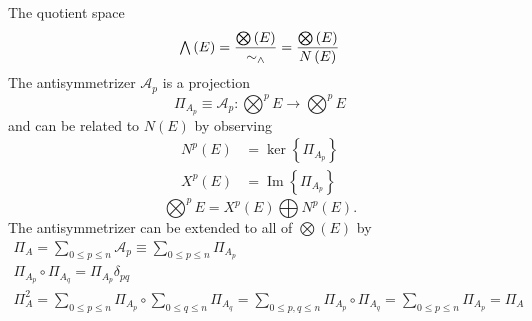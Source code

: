 \documentclass[aps,preprint]{revtex4}%
\begin{document}
The quotient space
\begin{equation}%
{\textstyle\bigwedge}
\left(  E\right)  =\frac{%
{\textstyle\bigotimes}
\left(  E\right)  }{\sim_{\wedge}}=\frac{%
{\textstyle\bigotimes}
\left(  E\right)  }{N\left(  E\right)  }%
\end{equation}
The antisymmetrizer $\mathcal{A}_{p}$ is a projection
\begin{equation}
\Pi_{A_{p}}\equiv\mathcal{A}_{p}:%
{\textstyle\bigotimes\nolimits^{p}}
E\rightarrow%
{\textstyle\bigotimes\nolimits^{p}}
E
\end{equation}
and can be related to $N\left(  E\right)  $ by observing
\begin{align}
N^{p}\left(  E\right)   &  =\ker\left\{  \Pi_{A_{p}}\right\}  \\
X^{p}\left(  E\right)   &  =\operatorname{Im}\left\{  \Pi_{A_{p}}\right\}
\end{align}%
\begin{equation}%
{\textstyle\bigotimes\nolimits^{p}}
E=X^{p}\left(  E\right)
{\textstyle\bigoplus}
N^{p}\left(  E\right)  .
\end{equation}
The antisymmetrizer can be extended to all of $%
{\textstyle\bigotimes}
\left(  E\right)  $ by
\begin{gather}
\Pi_{A}=%
{\textstyle\sum\limits_{0\leq p\leq n}}
\mathcal{A}_{p}\equiv%
{\textstyle\sum\limits_{0\leq p\leq n}}
\Pi_{A_{p}}\\
\Pi_{A_{p}}\circ\Pi_{A_{q}}=\Pi_{A_{p}}\delta_{pq}\\
\Pi_{A}^{2}=%
{\textstyle\sum\limits_{0\leq p\leq n}}
\Pi_{A_{p}}\circ%
{\textstyle\sum\limits_{0\leq q\leq n}}
\Pi_{A_{q}}=%
{\textstyle\sum\limits_{0\leq p,q\leq n}}
\Pi_{A_{p}}\circ\Pi_{A_{q}}=%
{\textstyle\sum\limits_{0\leq p\leq n}}
\Pi_{A_{p}}=\Pi_{A}%
\end{gather}
\end{document}
